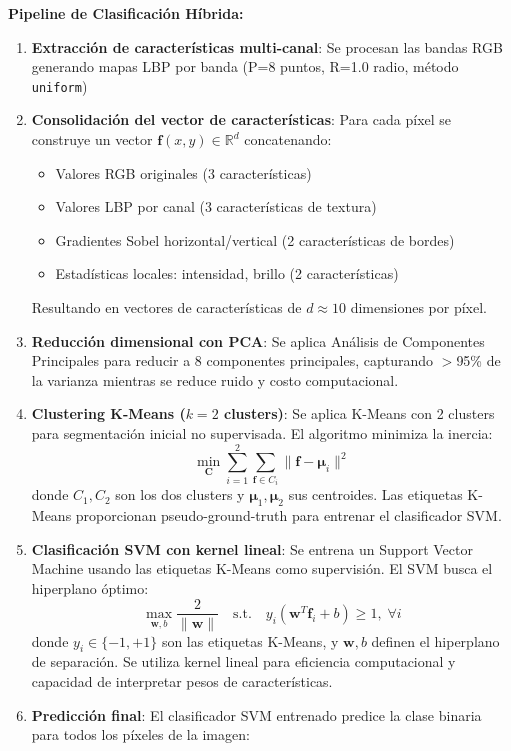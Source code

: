 \textbf{Pipeline de Clasificación Híbrida:}

\begin{enumerate}[itemsep=2pt]
	\item \textbf{Extracción de características multi-canal}: Se procesan las bandas RGB generando mapas LBP por banda (P=8 puntos, R=1.0 radio, método \texttt{uniform})
	\item \textbf{Consolidación del vector de características}: Para cada píxel se construye un vector $\mathbf{f}(x,y) \in \mathbb{R}^{d}$ concatenando:
	\begin{itemize}[itemsep=1pt]
		\item Valores RGB originales (3 características)
		\item Valores LBP por canal (3 características de textura)
		\item Gradientes Sobel horizontal/vertical (2 características de bordes)
		\item Estadísticas locales: intensidad, brillo (2 características)
	\end{itemize}
	Resultando en vectores de características de $d \approx 10$ dimensiones por píxel.
    
	\item \textbf{Reducción dimensional con PCA}: Se aplica Análisis de Componentes Principales para reducir a 8 componentes principales, capturando $>$95\% de la varianza mientras se reduce ruido y costo computacional.
    
	\item \textbf{Clustering K-Means ($k=2$ clusters)}: Se aplica K-Means con 2 clusters para segmentación inicial no supervisada. El algoritmo minimiza la inercia:
	\begin{equation}
	\min_{\mathbf{C}} \sum_{i=1}^{2} \sum_{\mathbf{f} \in C_i} \|\mathbf{f} - \boldsymbol{\mu}_i\|^2
	\label{eq:kmeans_objective}
	\end{equation}
	donde $C_1, C_2$ son los dos clusters y $\boldsymbol{\mu}_1, \boldsymbol{\mu}_2$ sus centroides. Las etiquetas K-Means proporcionan pseudo-ground-truth para entrenar el clasificador SVM.
    
	\item \textbf{Clasificación SVM con kernel lineal}: Se entrena un Support Vector Machine usando las etiquetas K-Means como supervisión. El SVM busca el hiperplano óptimo:
	\begin{equation}
	\max_{\mathbf{w}, b} \frac{2}{\|\mathbf{w}\|} \quad \text{s.t.} \quad y_i(\mathbf{w}^T\mathbf{f}_i + b) \geq 1, \; \forall i
	\label{eq:svm_objective}
	\end{equation}
	donde $y_i \in \{-1, +1\}$ son las etiquetas K-Means, y $\mathbf{w}, b$ definen el hiperplano de separación. Se utiliza kernel lineal para eficiencia computacional y capacidad de interpretar pesos de características.
    
	\item \textbf{Predicción final}: El clasificador SVM entrenado predice la clase binaria para todos los píxeles de la imagen:
\end{enumerate}


